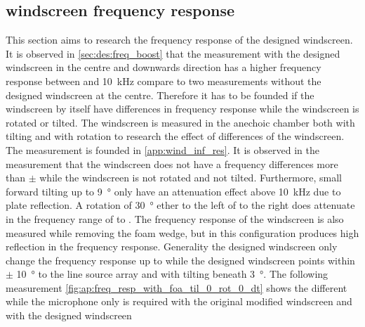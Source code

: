 \subsection{windscreen frequency response}\label{sec:ds:wind_freq_res}
This section aims to research the frequency response of the designed windscreen. It is observed in \autoref{sec:des:freq_boost} that the measurement with the designed windscreen in the centre and downwards direction has a higher frequency response between  and \SI{10}{\kilo\hertz} compare to two measurements without the designed windscreen at the centre. Therefore it has to be founded if the windscreen by itself have differences in frequency response while the windscreen is rotated or tilted. The windscreen is measured in the anechoic chamber both with tilting and with rotation to research the effect of differences of the windscreen. The measurement is founded in \autoref{app:wind_inf_res}. It is observed in the measurement that the windscreen does not have a frequency differences more than $\pm$ while the windscreen is not rotated and not tilted. Furthermore, small forward tilting up to \SI{9}{\degree} only have an attenuation effect above \SI{10}{\kilo\hertz} due to plate reflection. A rotation of \SI{30}{\degree} ether to the left of to the right does attenuate in the frequency range of  to . The frequency response of the windscreen is also measured while removing the foam wedge, but in this configuration produces high reflection in the frequency response. Generality the designed windscreen only change the frequency response up to  while the designed windscreen points within $\pm$ \SI{10}{\degree} to the line source array and with tilting beneath \SI{3}{\degree}. The following measurement \autoref{fig:ap:freq_resp_with_foa_til_0_rot_0_dt} shows the different while the microphone only is required with the original modified windscreen and with the designed windscreen





